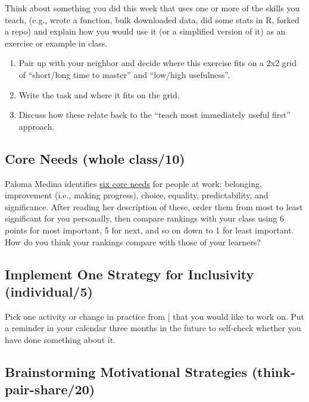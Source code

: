 Think about something you did this week that uses one or more of the
skills you teach, (e.g., wrote a function, bulk downloaded data, did
some stats in R, forked a repo) and explain how you would use it (or a
simplified version of it) as an exercise or example in class.

\begin{enumerate}
\item
  Pair up with your neighbor and decide where this exercise fits on a
  2x2 grid of ``short/long time to master'' and ``low/high
  usefulness''.
\item
  Write the task and where it fits on the grid.
\item
  Discuss how these relate back to the ``teach most immediately useful
  first'' approach.
\end{enumerate}

\subsection{Core Needs (whole class/10)}\label{core-needs-whole-class10}

Paloma Medina identifies \href{https://www.palomamedina.com/biceps}{six core needs} for people at
work: belonging, improvement (i.e., making progress), choice,
equality, predictability, and significance. After reading her
description of these, order them from most to least significant for
you personally, then compare rankings with your class using 6 points
for most important, 5 for next, and so on down to 1 for least
important. How do you think your rankings compare with those of your
learners?

\subsection{Implement One Strategy for Inclusivity (individual/5)}\label{implement-one-strategy-for-inclusivity-individual5}

Pick one activity or change in practice from {[}\protect[\hyperlink{b:Lee2017}{Lee2017}]{]} that you
would like to work on. Put a reminder in your calendar three months in
the future to self-check whether you have done something about it.

\subsection{Brainstorming Motivational Strategies (think-pair-share/20)}\label{brainstorming-motivational-strategies-think-pair-share20}

